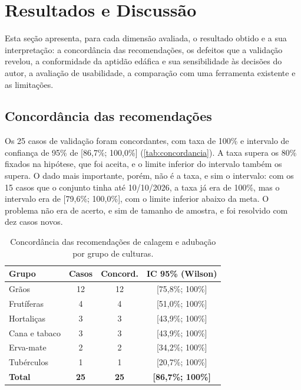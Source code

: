 \section{Resultados e Discussão}\label{sec:resultados}

Esta seção apresenta, para cada dimensão avaliada, o resultado obtido e a sua interpretação: a
concordância das recomendações, os defeitos que a validação revelou, a conformidade da aptidão
edáfica e sua sensibilidade às decisões do autor, a avaliação de usabilidade, a comparação com uma
ferramenta existente e as limitações.

\subsection{Concordância das recomendações}\label{sec:res_concordancia}

Os 25 casos de validação foram concordantes, com taxa de 100\% e intervalo de confiança de 95\%
de [86,7\%; 100,0\%] (\autoref{tab:concordancia}). A taxa supera os 80\% fixados na hipótese, que
foi aceita, e o limite inferior do intervalo também os supera. O dado mais importante, porém, não é a taxa, e
sim o intervalo: com os 15 casos que o conjunto tinha até 10/10/2026, a taxa já era de 100\%,
mas o intervalo era de [79,6\%; 100,0\%], com o limite inferior abaixo da meta. O problema não
era de acerto, e sim de tamanho de amostra, e foi resolvido com dez casos novos.

\begin{table}[htb]
\centering
\caption{Concordância das recomendações de calagem e adubação por grupo de culturas.}
\label{tab:concordancia}
\footnotesize
\begin{tabular}{lccc}
\toprule
\textbf{Grupo} & \textbf{Casos} & \textbf{Concord.} & \textbf{IC 95\% (Wilson)} \\
\midrule
Grãos          & 12 & 12 & [75,8\%; 100\%] \\
Frutíferas     &  4 &  4 & [51,0\%; 100\%] \\
Hortaliças     &  3 &  3 & [43,9\%; 100\%] \\
Cana e tabaco  &  3 &  3 & [43,9\%; 100\%] \\
Erva-mate      &  2 &  2 & [34,2\%; 100\%] \\
Tubérculos     &  1 &  1 & [20,7\%; 100\%] \\
\midrule
\textbf{Total} & \textbf{25} & \textbf{25} & \textbf{[86,7\%; 100\%]} \\
\bottomrule
\end{tabular}
\end{table}

